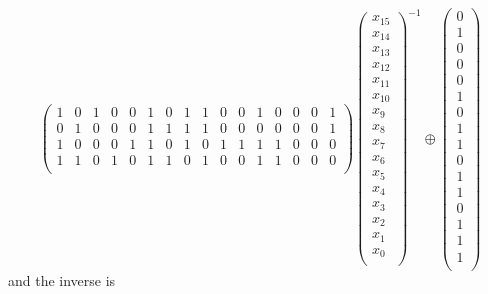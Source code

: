 \begin{equation*}
\begin{pmatrix}
1 & 0 & 1 & 0 & 0 & 1 & 0 & 1 & 1 & 0 & 0 & 1 & 0 & 0 & 0 & 1 \\
0 & 1 & 0 & 0 & 0 & 1 & 1 & 1 & 1 & 0 & 0 & 0 & 0 & 0 & 0 & 1 \\
1 & 0 & 0 & 0 & 1 & 1 & 0 & 1 & 0 & 1 & 1 & 1 & 1 & 0 & 0 & 0 \\
1 & 1 & 0 & 1 & 0 & 1 & 1 & 0 & 1 & 0 & 0 & 1 & 1 & 0 & 0 & 0 \\
\end{pmatrix}
\begin{pmatrix}
x_{15} \\
x_{14} \\
x_{13} \\
x_{12} \\
x_{11} \\
x_{10} \\
x_{9} \\
x_{8} \\
x_{7} \\
x_{6} \\
x_{5} \\
x_{4} \\
x_{3} \\
x_{2} \\
x_{1} \\
x_{0} \\
\end{pmatrix}
^{-1}
\oplus
\begin{pmatrix}
0 \\
1 \\
0 \\
0 \\
0 \\
1 \\
0 \\
1 \\
1 \\
0 \\
1 \\
1 \\
0 \\
1 \\
1 \\
1 \\
\end{pmatrix}
\end{equation*}
and the inverse is
